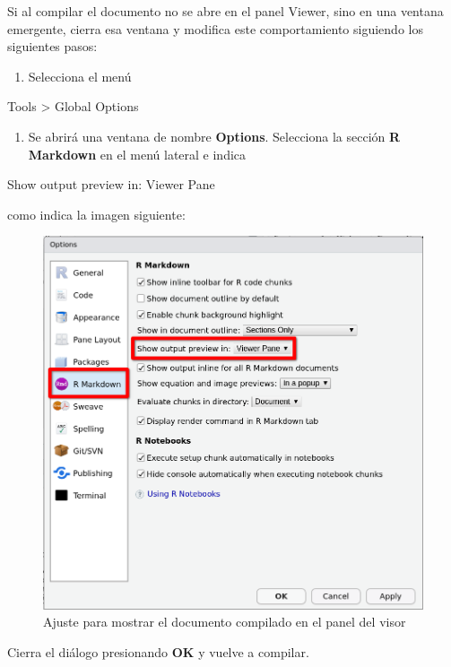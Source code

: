 \documentclass[
  title=normal,
  notoc,
  bib=normal]{mnye}
\providecommand{\tightlist}{%
  \setlength{\itemsep}{0pt}\setlength{\parskip}{0pt}}
\begin{document}
\begin{infobox}
Si al compilar el documento no se abre en el panel Viewer, sino en una ventana emergente, cierra esa ventana y modifica este comportamiento siguiendo los siguientes pasos:

\begin{enumerate}
\def\labelenumi{\arabic{enumi}.}
\tightlist
\item
  Selecciona el menú
\end{enumerate}

\begin{menu}
Tools \textgreater{} Global Options

\end{menu}

\begin{enumerate}
\def\labelenumi{\arabic{enumi}.}
\setcounter{enumi}{1}
\tightlist
\item
  Se abrirá una ventana de nombre \textbf{Options}. Selecciona la sección \textbf{R Markdown} en el menú lateral e indica
\end{enumerate}

\begin{menu}
Show output preview in: Viewer Pane

\end{menu}

como indica la imagen siguiente:

\begin{figure}

{\centering \includegraphics[width=1\linewidth]{images/options-r-markdown} 

}

\caption{Ajuste para mostrar el documento compilado en el panel del visor}\label{fig:unnamed-chunk-13}
\end{figure}

Cierra el diálogo presionando \textbf{OK} y vuelve a compilar.

\end{infobox}
\end{document}
